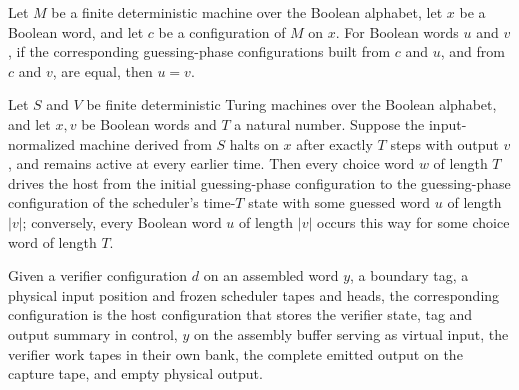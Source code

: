 \begin{lemma}
\label{Complexity.b2_guess_word_injective}
\leanok
{}
Let $M$ be a finite deterministic machine over the Boolean alphabet, let $x$ be a
Boolean word, and let $c$ be a configuration of $M$ on $x$. For Boolean words $u$ and
$v$, if the corresponding guessing-phase configurations built from $c$ and $u$, and from
$c$ and $v$, are equal, then $u=v$.
\end{lemma}

\begin{lemma}
\label{Complexity.b2_guess_coverage}
\leanok
{}
Let $S$ and $V$ be finite deterministic Turing machines over the Boolean alphabet, and
let $x,v$ be Boolean words and $T$ a natural number. Suppose the input-normalized
machine derived from $S$ halts on $x$ after exactly $T$ steps with output $v$, and
remains active at every earlier time. Then every choice word $w$ of length $T$ drives
the host from the initial guessing-phase configuration to the guessing-phase
configuration of the scheduler's time-$T$ state with some guessed word $u$ of length
$|v|$; conversely, every Boolean word $u$ of length $|v|$ occurs this way for some
choice word of length $T$.
\end{lemma}

\begin{definition}
\label{Complexity.b2VerifyCfg}
\leanok
{}
Given a verifier configuration $d$ on an assembled word $y$, a boundary tag, a physical input position and frozen scheduler tapes and heads, the corresponding configuration is the host configuration that stores the verifier state, tag and output summary in control, $y$ on the assembly buffer serving as virtual input, the verifier work tapes in their own bank, the complete emitted output on the capture tape, and empty physical output.
\end{definition}

